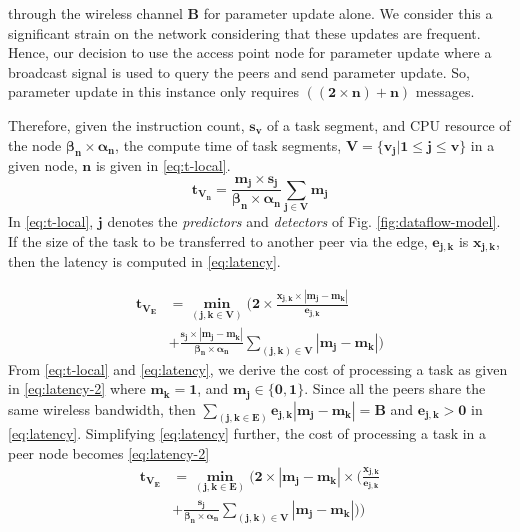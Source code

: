 through the wireless channel $ \bm{B} $ for parameter update 
alone. We consider this a significant strain on the network 
considering that these updates are frequent. Hence, our 
decision to use the access point node for parameter update 
where a broadcast signal is used to query the peers and send 
parameter update. So, parameter update in this 
instance only requires $ {\bm{((2\times n) + n)}} $ messages. 
\par 
Therefore, given the instruction count, $ \bm{s_v} $ of a 
task 
segment, and CPU resource of the node $ \bm{\beta_n 
\times \alpha_n} $, the compute time of task segments, ${ 
\bm{V=\{v_j|1\leq j \leq v\}}} $ in a given node, $ \bm{n} $ 
is given in \eqref{eq:t-local}.
\begin{equation}
	\bm{t_{V_n}=\frac{m_{j}\times 
	s_{j}}{\beta_n\times\alpha_n}\sum_{j\in 
	V}m_j}
	\label{eq:t-local}
\end{equation}
In \eqref{eq:t-local}, $ \bm{j} $ denotes the 
\emph{predictors} and \emph{detectors} of Fig. 
\ref{fig:dataflow-model}. If the size of the task to be 
transferred to another peer via the edge, $ \bm{e_{j,k}} $ is 
$ \bm{x_{j,k}} $, then the latency is computed in 
\eqref{eq:latency}.

\begin{equation}
\begin{split}
\bm{t_{V_{E}}} &= \bm{\min_{(j,k\in V)}( 2 
\times\frac{x_{j,k}\times|m_j-m_k|}{e_{j,k}}}\\
	&\bm{+\frac{s_j\times|m_j-m_k|}{\beta_n\times\alpha_n}\sum_{(j,k)\in
		V}|m_j-m_k|)}
\label{eq:latency}
\end{split}
\end{equation}
From \eqref{eq:t-local} and \eqref{eq:latency}, we derive the 
cost of processing a task as given in \eqref{eq:latency-2} where 
$ \bm{m_k=1} $, and $ \bm{m_j \in \{0,1\}} $. Since all the 
peers share the same wireless bandwidth, then $ 
{\bm{\sum_{(j,k\in E)}e_{j,k}|m_j-m_k|=B}} $ and $ 
{\bm{e_{j,k}>0}} $ in \eqref{eq:latency}. Simplifying 
\eqref{eq:latency} further, the cost of processing a task in a 
peer node becomes \eqref{eq:latency-2}
\begin{equation}
\begin{split}
\bm{t_{V_{E}}} &= \bm{\min_{(j,k\in E)}( 2 
	\times |m_j-m_k|\times(\frac{x_{j,k}}{e_{j,k}}}\\
&\bm{+\frac{s_j}{\beta_n\times\alpha_n}\sum_{(j,k)\in
		V}|m_j-m_k|))}
\label{eq:latency-2}
\end{split}
\end{equation}

